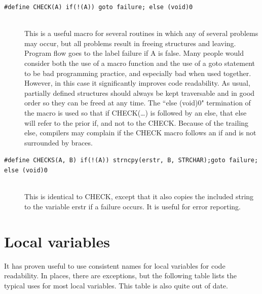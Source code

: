 \documentclass {scrbook}
\newcommand {\ttt} {\texttt}
\begin{document}
\begin{description}
\item[\ttt{\#define CHECK(A) if(!(A)) goto failure; else (void)0}]
\hfill \\
This is a useful macro for several routines in which any of several problems may occur, but all problems result in freeing structures and leaving. Program flow goes to the label failure if A is false. Many people would consider both the use of a macro function and the use of a goto statement to be bad programming practice, and especially bad when used together. However, in this case it significantly improves code readability. As usual, partially defined structures should always be kept traversable and in good order so they can be freed at any time. The ``else (void)0" termination of the macro is used so that if CHECK(\ldots) is followed by an else, that else will refer to the prior if, and not to the CHECK. Because of the trailing else, compilers may complain if the CHECK macro follows an if and is not surrounded by braces.

\item[\ttt{\#define CHECKS(A, B) if(!(A)) {strncpy(erstr, B, STRCHAR);goto failure;} else (void)0}]
\hfill \\
This is identical to CHECK, except that it also copies the included string to the variable erstr if a failure occurs. It is useful for error reporting.

\end{description}

\section{Local variables}

It has proven useful to use consistent names for local variables for code readability. In places, there are exceptions, but the following table lists the typical uses for most local variables. This table is also quite out of date.
\end{document}

